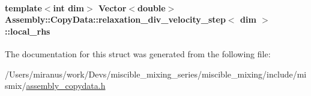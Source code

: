\paragraph[{local\+\_\+rhs}]{\setlength{\rightskip}{0pt plus 5cm}template$<$int dim$>$ Vector$<$double$>$ {\bf Assembly\+::\+Copy\+Data\+::relaxation\+\_\+div\+\_\+velocity\+\_\+step}$<$ dim $>$\+::local\+\_\+rhs}\label{struct_assembly_1_1_copy_data_1_1relaxation__div__velocity__step_ae75901aacdb5388ace8358c26786fe9c}


The documentation for this struct was generated from the following file\+:\begin{DoxyCompactItemize}
\item 
/\+Users/miranus/work/\+Devs/miscible\+\_\+mixing\+\_\+series/miscible\+\_\+mixing/include/mismix/\hyperlink{assembly__copydata_8h}{assembly\+\_\+copydata.\+h}\end{DoxyCompactItemize}
